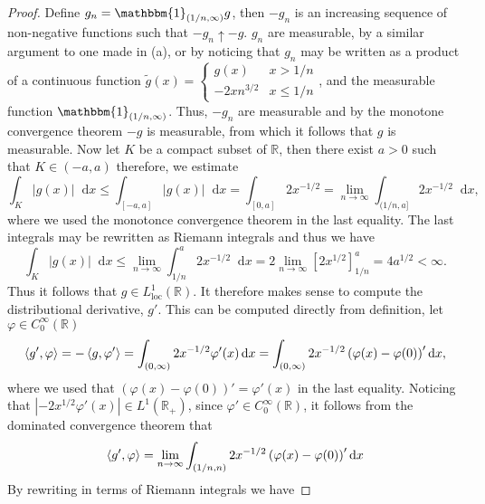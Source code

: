 \documentclass[a4paper,11pt]{article}
\newcommand{\abs}[1]{\left\lvert #1 \right\rvert}
\newcommand*\diff{\mathop{}\!\mathrm{d}}
\newcommand{\R}{\mathbb{R}}
\newcommand{\loc}{\text{loc}}
\numberwithin{equation}{section}
\begin{document}
\begin{proof}
Define $ g_n=\mathbbm{1}_{(1/n,\infty)}g $, then $ -g_n $ is an increasing sequence of non-negative functions such that $ -g_n\uparrow-g $. $ g_n $ are measurable, by a similar argument to one made in (a), or by noticing that $ g_n $ may be written as a product of a continuous function $ \tilde{g}(x)=\begin{cases}
g(x)&x>1/n\\
-2xn^{3/2}&x\leq1/n
\end{cases} $, and the measurable function $ \mathbbm{1}_{(1/n,\infty)} $. Thus, $ -g_n $ are measurable and by the monotone convergence theorem $ -g $ is measurable, from which it follows that $ g $ is measurable. Now let $ K $ be a compact subset of $ \R $, then there exist $ a>0 $ such that $ K\in(-a,a) $ therefore, we estimate \begin{equation}
\int_K\abs{g(x)}\diff x\leq\int_{[-a,a]}\abs{g(x)}\diff x=\int_{[0,a]}2x^{-1/2}=\lim\limits_{n\to\infty}\int_{(1/n,a]} 2x^{-1/2}\diff x,
\end{equation}
where we used the monotonce convergence theorem in the last equality. The last integrals may be rewritten as Riemann integrals and thus we have \begin{equation}
\int_K\abs{g(x)}\diff x\leq\lim\limits_{n\to\infty}\int_{1/n}^{a}2x^{-1/2}\diff x=2\lim\limits_{n\to\infty}\left[2x^{1/2}\right]_{1/n}^{a}=4a^{1/2}<\infty.
\end{equation}
Thus it follows that $ g\in L^1_\loc(\R) $. It therefore makes sense to compute the distributional derivative, $ g' $. This can be computed directly from definition, let $ \varphi\in C^\infty_0(\R) $ \begin{equation}
\braket{g',\varphi}=-\braket{g,\varphi'}=\int_{(0,\infty)} 2x^{-1/2}\varphi'(x)\diff x=\int_{(0,\infty)} 2x^{-1/2}\left(\varphi(x)-\varphi(0)\right)'\diff x,
\end{equation}
where we used that $ \left(\varphi(x)-\varphi(0)\right)'=\varphi'(x) $ in the last equality. Noticing that $ \abs{-2x^{1/2}\varphi'(x)}\in L^1(\R_+) $, since $ \varphi'\in C^\infty_0(\R) $, it follows from the dominated convergence theorem that \begin{equation}
\begin{aligned}
\braket{g',\varphi}=\lim\limits_{n\to\infty}\int_{(1/n,n)} 2x^{-1/2}\left(\varphi(x)-\varphi(0)\right)'\diff x
\end{aligned}
\end{equation}
By rewriting in terms of Riemann integrals we have

\end{proof}
\end{document}
